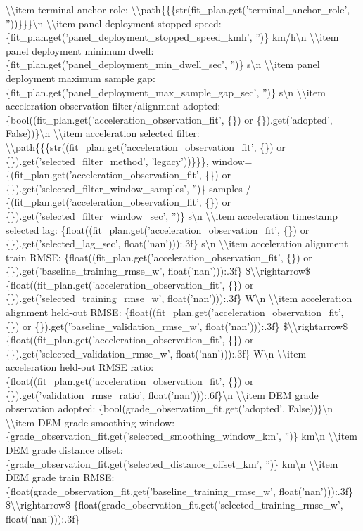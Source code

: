 \documentclass[a4paper,11pt]{article}
\begin{document}
\begin{enumerate}[leftmargin=1.8em]
\textbackslash{}\textbackslash{}item terminal anchor role: \textbackslash{}\textbackslash{}path\{\{\{str(fit\_plan.get('terminal\_anchor\_role', ''))\}\}\}\textbackslash{}n  \textbackslash{}\textbackslash{}item panel deployment stopped speed: \{fit\_plan.get('panel\_deployment\_stopped\_speed\_kmh', '')\} km/h\textbackslash{}n  \textbackslash{}\textbackslash{}item panel deployment minimum dwell: \{fit\_plan.get('panel\_deployment\_min\_dwell\_sec', '')\} s\textbackslash{}n  \textbackslash{}\textbackslash{}item panel deployment maximum sample gap: \{fit\_plan.get('panel\_deployment\_max\_sample\_gap\_sec', '')\} s\textbackslash{}n  \textbackslash{}\textbackslash{}item acceleration observation filter/alignment adopted: \{bool((fit\_plan.get('acceleration\_observation\_fit', \{\}) or \{\}).get('adopted', False))\}\textbackslash{}n  \textbackslash{}\textbackslash{}item acceleration selected filter: \textbackslash{}\textbackslash{}path\{\{\{str((fit\_plan.get('acceleration\_observation\_fit', \{\}) or \{\}).get('selected\_filter\_method', 'legacy'))\}\}\}, window=\{(fit\_plan.get('acceleration\_observation\_fit', \{\}) or \{\}).get('selected\_filter\_window\_samples', '')\} samples / \{(fit\_plan.get('acceleration\_observation\_fit', \{\}) or \{\}).get('selected\_filter\_window\_sec', '')\} s\textbackslash{}n  \textbackslash{}\textbackslash{}item acceleration timestamp selected lag: \{float((fit\_plan.get('acceleration\_observation\_fit', \{\}) or \{\}).get('selected\_lag\_sec', float('nan'))):.3f\} s\textbackslash{}n  \textbackslash{}\textbackslash{}item acceleration alignment train RMSE: \{float((fit\_plan.get('acceleration\_observation\_fit', \{\}) or \{\}).get('baseline\_training\_rmse\_w', float('nan'))):.3f\} \$\textbackslash{}\textbackslash{}rightarrow\$ \{float((fit\_plan.get('acceleration\_observation\_fit', \{\}) or \{\}).get('selected\_training\_rmse\_w', float('nan'))):.3f\} W\textbackslash{}n  \textbackslash{}\textbackslash{}item acceleration alignment held-out RMSE: \{float((fit\_plan.get('acceleration\_observation\_fit', \{\}) or \{\}).get('baseline\_validation\_rmse\_w', float('nan'))):.3f\} \$\textbackslash{}\textbackslash{}rightarrow\$ \{float((fit\_plan.get('acceleration\_observation\_fit', \{\}) or \{\}).get('selected\_validation\_rmse\_w', float('nan'))):.3f\} W\textbackslash{}n  \textbackslash{}\textbackslash{}item acceleration held-out RMSE ratio: \{float((fit\_plan.get('acceleration\_observation\_fit', \{\}) or \{\}).get('validation\_rmse\_ratio', float('nan'))):.6f\}\textbackslash{}n  \textbackslash{}\textbackslash{}item DEM grade observation adopted: \{bool(grade\_observation\_fit.get('adopted', False))\}\textbackslash{}n  \textbackslash{}\textbackslash{}item DEM grade smoothing window: \{grade\_observation\_fit.get('selected\_smoothing\_window\_km', '')\} km\textbackslash{}n  \textbackslash{}\textbackslash{}item DEM grade distance offset: \{grade\_observation\_fit.get('selected\_distance\_offset\_km', '')\} km\textbackslash{}n  \textbackslash{}\textbackslash{}item DEM grade train RMSE: \{float(grade\_observation\_fit.get('baseline\_training\_rmse\_w', float('nan'))):.3f\} \$\textbackslash{}\textbackslash{}rightarrow\$ \{float(grade\_observation\_fit.get('selected\_training\_rmse\_w', float('nan'))):.3f\} 
\end{enumerate}
\end{document}
